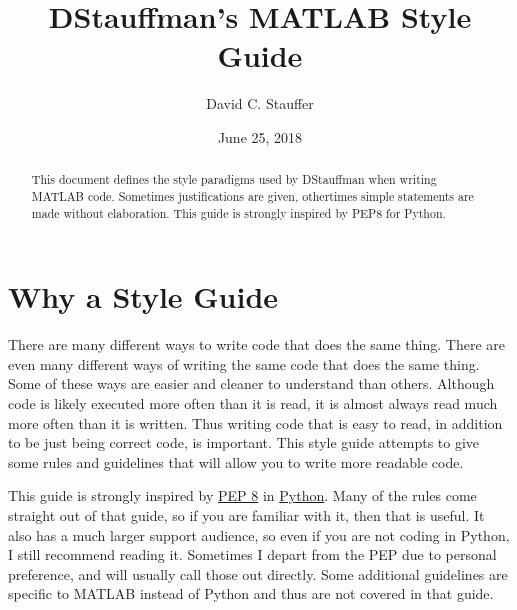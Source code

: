 \documentclass[12pt]{article}
\begin{document}
\title{DStauffman's MATLAB Style Guide}
\author{David C. Stauffer}
\date{June 25, 2018}
\maketitle

\begin{abstract}\label{Abstract}
This document defines the style paradigms used by DStauffman when writing MATLAB code.  Sometimes justifications are given, othertimes simple statements are made without elaboration.  This guide is strongly inspired by PEP8 for Python.
\end{abstract}

\begin{versionhistory}
\end{versionhistory}

\pagebreak
\tableofcontents
{}

\pagebreak
\listoffigures
{}
\listoftables
{}

\pagebreak
\section{Why a Style Guide}\label{h1:why_style_guide}
There are many different ways to write code that does the same thing.  There are even many different ways of writing the same code that does the same thing.  Some of these ways are easier and cleaner to understand than others.  Although code is likely executed more often than it is read, it is almost always read much more often than it is written.  Thus writing code that is easy to read, in addition to be just being correct code, is important.  This style guide attempts to give some rules and guidelines that will allow you to write more readable code.

This guide is strongly inspired by \href{https://www.python.org/dev/peps/pep-0008/}{PEP 8} in \href{https://www.python.org/}{Python}.  Many of the rules come straight out of that guide, so if you are familiar with it, then that is useful.  It also has a much larger support audience, so even if you are not coding in Python, I still recommend reading it.  Sometimes I depart from the PEP due to personal preference, and will usually call those out directly.  Some additional guidelines are specific to MATLAB instead of Python and thus are not covered in that guide.
\end{document}
